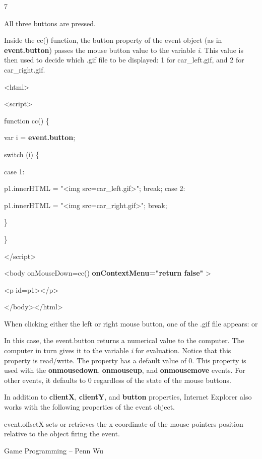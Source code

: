 \documentclass[
]{article}
\begin{document}
7

All three buttons are pressed.

Inside the cc() function, the button property of the event object (as in
\textbf{event.button}) passes the mouse button value to the variable
\emph{i}. This value is then used to decide which .gif file to be
displayed: 1 for car\_left.gif, and 2 for car\_right.gif.

\textless html\textgreater{}

\textless script\textgreater{}

function cc() \{

var i = \textbf{event.button};

switch (i) \{

case 1:

p1.innerHTML = "\textless img
src=\textquotesingle car\_left.gif\textquotesingle\textgreater"; break;
case 2:

p1.innerHTML = "\textless img
src=\textquotesingle car\_right.gif\textquotesingle\textgreater"; break;

\}

\}

\textless/script\textgreater{}

\textless body onMouseDown=cc() \textbf{onContextMenu="return false"}
\textgreater{}

\textless p id=p1\textgreater\textless/p\textgreater{}

\textless/body\textgreater\textless/html\textgreater{}

When clicking either the left or right mouse button, one of the .gif
file appears: or

In this case, the event.button returns a numerical value to the
computer. The computer in turn gives it to the variable \emph{i} for
evaluation. Notice that this property is read/write. The property has a
default value of 0. This property is used with the \textbf{onmousedown},
\textbf{onmouseup}, and \textbf{onmousemove} events. For other events,
it defaults to 0 regardless of the state of the mouse buttons.

In addition to \textbf{clientX}, \textbf{clientY}, and \textbf{button}
properties, Internet Explorer also works with the following properties
of the event object.

event.offsetX sets or retrieves the x-coordinate of the mouse
pointer\textquotesingle s position relative to the object firing the
event.

Game Programming -- Penn Wu
\end{document}

